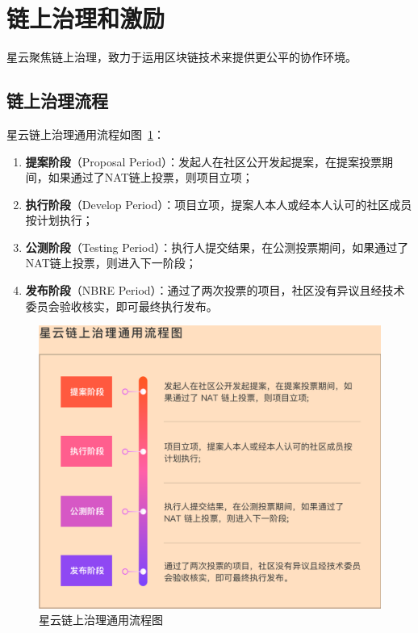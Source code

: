 \section{链上治理和激励}

星云聚焦链上治理，致力于运用区块链技术来提供更公平的协作环境。

\subsection{链上治理流程}
\label{governance}

星云链上治理通用流程如图~\ref{fig:on-chain-governance}：

\begin{enumerate}
	\item \textbf{提案阶段}（Proposal Period）：发起人在社区公开发起提案，在提案投票期间，如果通过了NAT链上投票，则项目立项；
	\item \textbf{执行阶段}（Develop Period）：项目立项，提案人本人或经本人认可的社区成员按计划执行；
	\item \textbf{公测阶段}（Testing Period）：执行人提交结果，在公测投票期间，如果通过了NAT链上投票，则进入下一阶段；
	\item \textbf{发布阶段}（NBRE Period）：通过了两次投票的项目，社区没有异议且经技术委员会验收核实，即可最终执行发布。
\end{enumerate}

\begin{figure}
	\centering
	\includegraphics[width=1\textwidth]{../common/ch/on-chain-governance.png}
	\caption{星云链上治理通用流程图 \label{fig:on-chain-governance}}
\end{figure}

